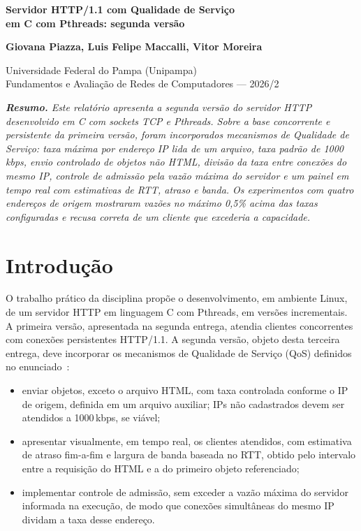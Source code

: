 \documentclass[12pt,a4paper]{article}
\begin{document}
\begin{center}
{\fontsize{16}{20}\bfseries Servidor HTTP/1.1 com Qualidade de Serviço\\ em C com Pthreads: segunda versão\par}
\vspace{12pt}
{\bfseries Giovana Piazza, Luis Felipe Maccalli, Vitor Moreira\par}
\vspace{6pt}
Universidade Federal do Pampa (Unipampa)\\
Fundamentos e Avaliação de Redes de Computadores --- 2026/2
\end{center}

\vspace{6pt}
\begin{list}{}{\leftmargin=0.8cm\rightmargin=0.8cm}\item\itshape
\textbf{\upshape Resumo.} Este relatório apresenta a segunda versão do servidor HTTP
desenvolvido em C com sockets TCP e Pthreads. Sobre a base concorrente e persistente da
primeira versão, foram incorporados mecanismos de Qualidade de Serviço: taxa máxima por
endereço IP lida de um arquivo, taxa padrão de 1000\,kbps, envio controlado de objetos
não HTML, divisão da taxa entre conexões do mesmo IP, controle de admissão pela vazão
máxima do servidor e um painel em tempo real com estimativas de RTT, atraso e banda. Os
experimentos com quatro endereços de origem mostraram vazões no máximo 0,5\% acima das
taxas configuradas e recusa correta de um cliente que excederia a capacidade.
\end{list}

\section{Introdução}

O trabalho prático da disciplina propõe o desenvolvimento, em ambiente Linux, de um
servidor HTTP em linguagem C com Pthreads, em versões incrementais. A primeira versão,
apresentada na segunda entrega, atendia clientes concorrentes com conexões persistentes
HTTP/1.1. A segunda versão, objeto desta terceira entrega, deve incorporar os mecanismos de
Qualidade de Serviço (QoS) definidos no enunciado~\cite{spec}:

\begin{itemize}
  \item enviar objetos, exceto o arquivo HTML, com taxa controlada conforme o IP de origem,
  definida em um arquivo auxiliar; IPs não cadastrados devem ser atendidos a 1000\,kbps, se viável;
  \item apresentar visualmente, em tempo real, os clientes atendidos, com estimativa de
  atraso fim-a-fim e largura de banda baseada no RTT, obtido pelo intervalo entre a
  requisição do HTML e a do primeiro objeto referenciado;
  \item implementar controle de admissão, sem exceder a vazão máxima do servidor informada
  na execução, de modo que conexões simultâneas do mesmo IP dividam a taxa desse endereço.
\end{itemize}
\end{document}
